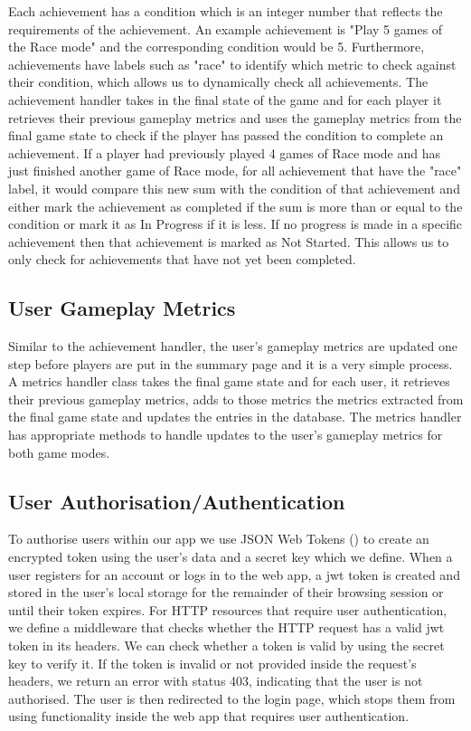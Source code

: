 \documentclass{l4proj}
\begin{document}
Each achievement has a condition which is an integer number that reflects the requirements of the achievement. An example achievement is "Play 5 games of the Race mode" and the corresponding condition would be 5. Furthermore, achievements have labels such as "race" to identify which metric to check against their condition, which allows us to dynamically check all achievements. The achievement handler takes in the final state of the game and for each player it retrieves their previous gameplay metrics and uses the gameplay metrics from the final game state to check if the player has passed the condition to complete an achievement. If a player had previously played 4 games of Race mode and has just finished another game of Race mode, for all achievement that have the "race" label, it would compare this new sum with the condition of that achievement and either mark the achievement as completed if the sum is more than or equal to the condition or mark it as In Progress if it is less. If no progress is made in a specific achievement then that achievement is marked as Not Started. This allows us to only check for achievements that have not yet been completed.

\subsection{User Gameplay Metrics}
Similar to the achievement handler, the user's gameplay metrics are updated one step before players are put in the summary page and it is a very simple process. A metrics handler class takes the final game state and for each user, it retrieves their previous gameplay metrics, adds to those metrics the metrics extracted from the final game state and updates the entries in the database. The metrics handler has appropriate methods to handle updates to the user's gameplay metrics for both game modes.

\subsection{User Authorisation/Authentication}
To authorise users within our app we use JSON Web Tokens (\cite{jwt}) to create an encrypted token using the user's data and a secret key which we define. When a user registers for an account or logs in to the web app, a jwt token is created and stored in the user's local storage for the remainder of their browsing session or until their token expires. For HTTP resources that require user authentication, we define a middleware that checks whether the HTTP request has a valid jwt token in its headers. We can check whether a token is valid by using the secret key to verify it. If the token is invalid or not provided inside the request's headers, we return an error with status 403, indicating that the user is not authorised. The user is then redirected to the login page, which stops them from using functionality inside the web app that requires user authentication.
\end{document}
